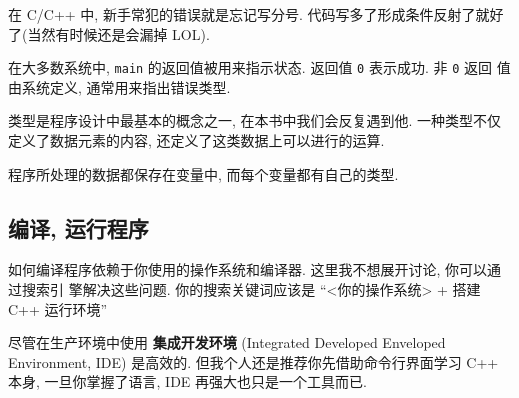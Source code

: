 \documentclass[lang=cn]{elegantbook}
\begin{document}
\begin{note}
在 C/C++ 中, 新手常犯的错误就是忘记写分号. 代码写多了形成条件反射了就好了(当然有时候还是会漏掉 LOL).
\end{note}

\vspace*{1\baselineskip}

在大多数系统中, \texttt{main} 的返回值被用来指示状态. 返回值 \texttt{0} 表示成功. 非 \texttt{0} 返回
值由系统定义, 通常用来指出错误类型.

\vspace*{1\baselineskip}

\begin{definition}[类型]
类型是程序设计中最基本的概念之一, 在本书中我们会反复遇到他. 一种类型不仅定义了数据元素的内容, 还定义了这类数据上可以进行的运算.

程序所处理的数据都保存在变量中, 而每个变量都有自己的类型.
\end{definition}

\subsection{编译, 运行程序}
\label{sec:orgd46695c}

如何编译程序依赖于你使用的操作系统和编译器. 这里我不想展开讨论, 你可以通过搜索引
擎解决这些问题. 你的搜索关键词应该是 ``<你的操作系统> + 搭建 C++ 运行环境''

尽管在生产环境中使用 \textbf{集成开发环境} (Integrated Developed Enveloped Environment,
IDE) 是高效的. 但我个人还是推荐你先借助命令行界面学习 C++ 本身, 一旦你掌握了语言,
IDE 再强大也只是一个工具而已.
\end{document}
